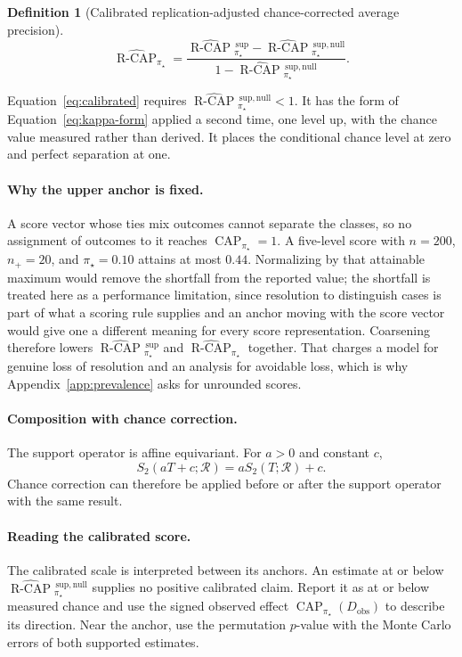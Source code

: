 \documentclass[11pt]{article}
\newcommand{\CAP}{\operatorname{CAP}}
\newcommand{\Regime}{\mathcal{R}}
\newcommand{\Tpi}{\CAP_{\pi_\star}}
\newcommand{\RCAPHat}{\widehat{\operatorname{R\text{-}CAP}}{}^{\,\mathrm{sup}}_{\pi_\star}}
\newcommand{\RCAPnullHat}{\widehat{\operatorname{R\text{-}CAP}}{}^{\,\mathrm{sup,null}}_{\pi_\star}}
\newcommand{\RCAPcalHat}{\widehat{\operatorname{R\text{-}CAP}}_{\pi_\star}}
\newtheorem{definition}{Definition}
\theoremstyle{remark}
\begin{document}
\begin{definition}[Calibrated replication-adjusted chance-corrected average precision]
\begin{equation}
\RCAPcalHat
=
\frac{\RCAPHat-\RCAPnullHat}{1-\RCAPnullHat}.
\label{eq:calibrated}
\end{equation}
\end{definition}

Equation~\eqref{eq:calibrated} requires $\RCAPnullHat<1$. It has the form of Equation~\eqref{eq:kappa-form} applied a second time, one level up, with the chance value measured rather than derived. It places the conditional chance level at zero and perfect separation at one.

\paragraph{Why the upper anchor is fixed.}
A score vector whose ties mix outcomes cannot separate the classes, so no assignment of outcomes to it reaches $\Tpi=1$. A five-level score with $n=200$, $n_+=20$, and $\pi_\star=0.10$ attains at most $0.44$. Normalizing by that attainable maximum would remove the shortfall from the reported value; the shortfall is treated here as a performance limitation, since resolution to distinguish cases is part of what a scoring rule supplies and an anchor moving with the score vector would give one a different meaning for every score representation. Coarsening therefore lowers $\RCAPHat$ and $\RCAPcalHat$ together. That charges a model for genuine loss of resolution and an analysis for avoidable loss, which is why Appendix~\ref{app:prevalence} asks for unrounded scores.

\paragraph{Composition with chance correction.}
The support operator is affine equivariant. For $a>0$ and constant $c$,
\[
S_2(aT+c;\Regime)=aS_2(T;\Regime)+c.
\]
Chance correction can therefore be applied before or after the support operator with the same result.

\paragraph{Reading the calibrated score.}
The calibrated scale is interpreted between its anchors. An estimate at or below $\RCAPnullHat$ supplies no positive calibrated claim. Report it as at or below measured chance and use the signed observed effect $\Tpi(D_{\mathrm{obs}})$ to describe its direction. Near the anchor, use the permutation $p$-value with the Monte Carlo errors of both supported estimates.
\end{document}
